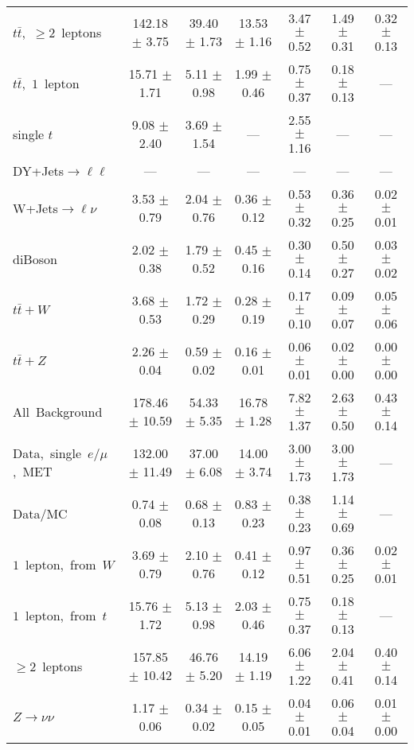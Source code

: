 \documentclass{article}
\begin{document}
\begin{longtable}{|l|c|c|c|c|c|c|}
$t\bar{t}$,~$\ge2$~leptons & 142.18 $\pm$ 3.75  & 39.40 $\pm$ 1.73  & 13.53 $\pm$ 1.16  & 3.47 $\pm$ 0.52  & 1.49 $\pm$ 0.31  & 0.32 $\pm$ 0.13 \\* 
$t\bar{t}$,~$1$~lepton & 15.71 $\pm$ 1.71  & 5.11 $\pm$ 0.98  & 1.99 $\pm$ 0.46  & 0.75 $\pm$ 0.37  & 0.18 $\pm$ 0.13  & --- \\* 
single $t$  & 9.08 $\pm$ 2.40  & 3.69 $\pm$ 1.54  & ---  & 2.55 $\pm$ 1.16  & ---  & --- \\* 
DY+Jets$\rightarrow\ell\ell$  & ---  & ---  & ---  & ---  & ---  & --- \\* 
W+Jets$\rightarrow\ell\nu$  & 3.53 $\pm$ 0.79  & 2.04 $\pm$ 0.76  & 0.36 $\pm$ 0.12  & 0.53 $\pm$ 0.32  & 0.36 $\pm$ 0.25  & 0.02 $\pm$ 0.01 \\* 
diBoson  & 2.02 $\pm$ 0.38  & 1.79 $\pm$ 0.52  & 0.45 $\pm$ 0.16  & 0.30 $\pm$ 0.14  & 0.50 $\pm$ 0.27  & 0.03 $\pm$ 0.02 \\* 
$t\bar{t}+W$  & 3.68 $\pm$ 0.53  & 1.72 $\pm$ 0.29  & 0.28 $\pm$ 0.19  & 0.17 $\pm$ 0.10  & 0.09 $\pm$ 0.07  & 0.05 $\pm$ 0.06 \\* 
$t\bar{t}+Z$  & 2.26 $\pm$ 0.04  & 0.59 $\pm$ 0.02  & 0.16 $\pm$ 0.01  & 0.06 $\pm$ 0.01  & 0.02 $\pm$ 0.00  & 0.00 $\pm$ 0.00 \\* 
\hline \hline 
All~Background  & 178.46 $\pm$ 10.59  & 54.33 $\pm$ 5.35  & 16.78 $\pm$ 1.28  & 7.82 $\pm$ 1.37  & 2.63 $\pm$ 0.50  & 0.43 $\pm$ 0.14 \\* 
Data,~single~$e/\mu$,~MET  & 132.00 $\pm$ 11.49  & 37.00 $\pm$ 6.08  & 14.00 $\pm$ 3.74  & 3.00 $\pm$ 1.73  & 3.00 $\pm$ 1.73  & --- \\* 
Data/MC  & 0.74 $\pm$ 0.08  & 0.68 $\pm$ 0.13  & 0.83 $\pm$ 0.23  & 0.38 $\pm$ 0.23  & 1.14 $\pm$ 0.69  & --- \\* 
\hline \hline 
$1$~lepton,~from~$W$  & 3.69 $\pm$ 0.79  & 2.10 $\pm$ 0.76  & 0.41 $\pm$ 0.12  & 0.97 $\pm$ 0.51  & 0.36 $\pm$ 0.25  & 0.02 $\pm$ 0.01 \\* 
$1$~lepton,~from~$t$  & 15.76 $\pm$ 1.72  & 5.13 $\pm$ 0.98  & 2.03 $\pm$ 0.46  & 0.75 $\pm$ 0.37  & 0.18 $\pm$ 0.13  & --- \\* 
$\ge2$~leptons  & 157.85 $\pm$ 10.42  & 46.76 $\pm$ 5.20  & 14.19 $\pm$ 1.19  & 6.06 $\pm$ 1.22  & 2.04 $\pm$ 0.41  & 0.40 $\pm$ 0.14 \\* 
$Z\rightarrow\nu\nu$  & 1.17 $\pm$ 0.06  & 0.34 $\pm$ 0.02  & 0.15 $\pm$ 0.05  & 0.04 $\pm$ 0.01  & 0.06 $\pm$ 0.04  & 0.01 $\pm$ 0.00 \\* 
\hline 
\end{longtable} 
\end{document}
